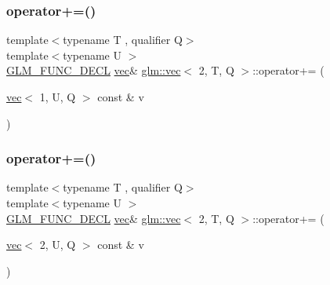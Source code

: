\subsubsection{\texorpdfstring{operator+=()}{operator+=()}\hspace{0.1cm}{\footnotesize\ttfamily [5/6]}}
{\footnotesize\ttfamily template$<$typename T , qualifier Q$>$ \\
template$<$typename U $>$ \\
\mbox{\hyperlink{setup_8hpp_ab2d052de21a70539923e9bcbf6e83a51}{G\+L\+M\+\_\+\+F\+U\+N\+C\+\_\+\+D\+E\+CL}} \mbox{\hyperlink{structglm_1_1vec}{vec}}\& \mbox{\hyperlink{structglm_1_1vec}{glm\+::vec}}$<$ 2, T, Q $>$\+::operator+= (\begin{DoxyParamCaption}\item[{\mbox{\hyperlink{structglm_1_1vec}{vec}}$<$ 1, U, Q $>$ const \&}]{v }\end{DoxyParamCaption})}

\mbox{\label{structglm_1_1vec_3_012_00_01_t_00_01_q_01_4_aca945ef129a7730690a1b216b5aa67b0}} 
\subsubsection{\texorpdfstring{operator+=()}{operator+=()}\hspace{0.1cm}{\footnotesize\ttfamily [6/6]}}
{\footnotesize\ttfamily template$<$typename T , qualifier Q$>$ \\
template$<$typename U $>$ \\
\mbox{\hyperlink{setup_8hpp_ab2d052de21a70539923e9bcbf6e83a51}{G\+L\+M\+\_\+\+F\+U\+N\+C\+\_\+\+D\+E\+CL}} \mbox{\hyperlink{structglm_1_1vec}{vec}}\& \mbox{\hyperlink{structglm_1_1vec}{glm\+::vec}}$<$ 2, T, Q $>$\+::operator+= (\begin{DoxyParamCaption}\item[{\mbox{\hyperlink{structglm_1_1vec}{vec}}$<$ 2, U, Q $>$ const \&}]{v }\end{DoxyParamCaption})}

\mbox{\label{structglm_1_1vec_3_012_00_01_t_00_01_q_01_4_a213bf05d1d3abd8ed5da4908cd3dfdd7}} 
